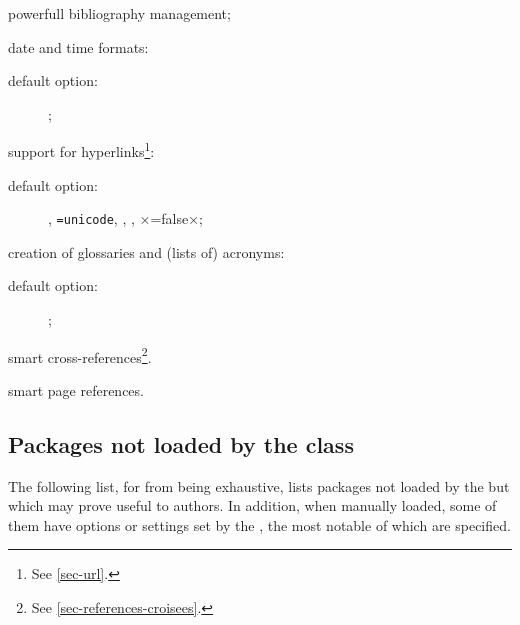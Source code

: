 \documentclass[english,nolocaltoc]{nwejmart}
\newtheorem[style=definition]{fact}
\newtheorem[title-plural=Criteria]{criterion}
\newtheorem[title=random experiment]{rexp}
\begin{document}
\begin{description}
\begin{description}
  \end{description}
\item[\package{biblatex}:] powerfull bibliography management;
\item[\package{datetime2}:] date  and time formats:
  \begin{description}
  \item[default option:] ;
  \end{description}
\item[\package{hyperref} :] support for hyperlinks\footnote{See \vref{sec-url}.}:
  \begin{description}
  \item[default option:] ,
    \lstinline[alsolanguage={[hyperref]TeX}]×=unicode×,
    , ,
    ×=false×;
  \end{description}
\item[\package{glossaries}:] creation of glossaries and  (lists of) acronyms:
  \begin{description}
  \item[default option:] ;
  \end{description}
\item[\package{zref-clever} :] smart cross-references\footnote{See
    \vref{sec-references-croisees}.}.
\item[\package{zref-varioref} :] smart page references.
\end{description}

\subsection{Packages not loaded by the  class}\label{sec:packages-non-charges}

The following list, for from being exhaustive, lists packages not
loaded by the \nwejmauthorcl{} but which may prove useful to
authors. In addition, when manually loaded, some of them have options
or settings set by the \nwejmauthorcl{}, the most notable of which are specified. 
\end{document}
